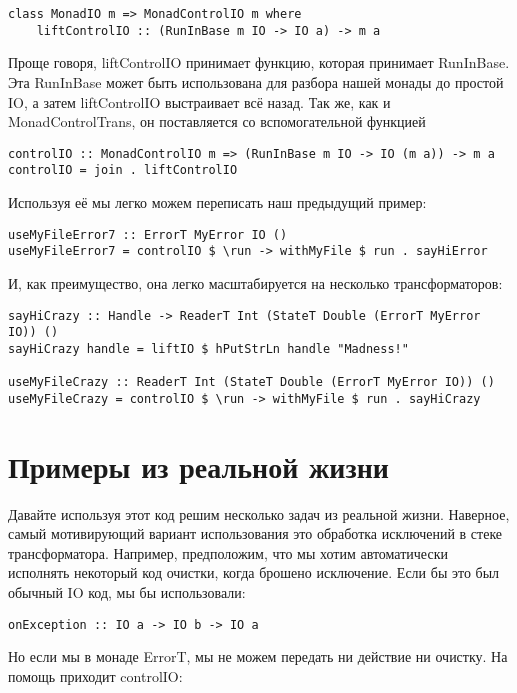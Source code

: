 \begin{lstlisting}
class MonadIO m => MonadControlIO m where
    liftControlIO :: (RunInBase m IO -> IO a) -> m a
\end{lstlisting}

Проще говоря, liftControlIO принимает функцию, которая принимает RunInBase. Эта
RunInBase может быть использована для разбора нашей монады до простой IO, а
затем liftControlIO выстраивает всё назад. Так же, как и MonadControlTrans, он
поставляется со вспомогательной функцией

\begin{lstlisting}
controlIO :: MonadControlIO m => (RunInBase m IO -> IO (m a)) -> m a
controlIO = join . liftControlIO
\end{lstlisting}

Используя её мы легко можем переписать наш предыдущий пример:

\begin{lstlisting}
useMyFileError7 :: ErrorT MyError IO ()
useMyFileError7 = controlIO $ \run -> withMyFile $ run . sayHiError
\end{lstlisting}

И, как преимущество, она легко масштабируется на несколько трансформаторов:

\begin{lstlisting}
sayHiCrazy :: Handle -> ReaderT Int (StateT Double (ErrorT MyError IO)) ()
sayHiCrazy handle = liftIO $ hPutStrLn handle "Madness!"

useMyFileCrazy :: ReaderT Int (StateT Double (ErrorT MyError IO)) ()
useMyFileCrazy = controlIO $ \run -> withMyFile $ run . sayHiCrazy
\end{lstlisting}

\section{Примеры из реальной жизни}
Давайте используя этот код решим несколько задач из реальной жизни. Наверное,
самый мотивирующий вариант использования это обработка исключений в стеке
трансформатора. Например, предположим, что мы хотим автоматически исполнять
некоторый код очистки, когда брошено исключение. Если бы это был обычный IO
код, мы бы использовали:

\begin{lstlisting}
onException :: IO a -> IO b -> IO a
\end{lstlisting}

Но если мы в монаде ErrorT, мы не можем передать ни действие ни очистку. На
помощь приходит controlIO:

